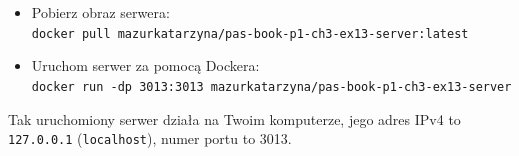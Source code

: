 \begin{enumerate}[label=\textbf{3.\arabic*}]
\begin{itemize}
\item Pobierz obraz serwera:\\ \texttt{docker pull mazurkatarzyna/pas-book-p1-ch3-ex13-server:latest}

\item Uruchom serwer za pomocą Dockera:\\ \texttt{docker run -dp 3013:3013 mazurkatarzyna/pas-book-p1-ch3-ex13-server}
\end{itemize}

\noindent Tak uruchomiony serwer działa na Twoim komputerze, jego adres IPv4 to \texttt{127.0.0.1} (\texttt{localhost}), numer portu to 3013.

\end{enumerate}
\newpage
